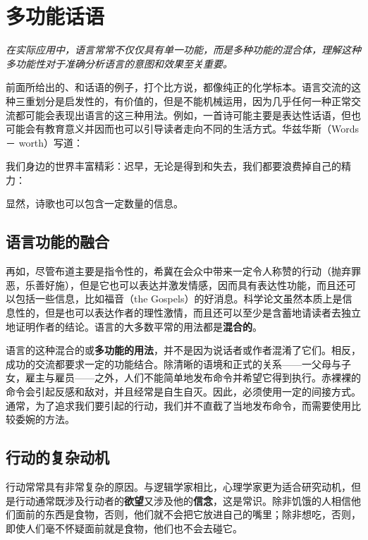 \section{多功能话语}

\begin{logicbox}[title=引言]
\textit{在实际应用中，语言常常不仅仅具有单一功能，而是多种功能的混合体，理解这种多功能性对于准确分析语言的意图和效果至关重要。}
\end{logicbox}

前面所给出的、和话语的例子，打个比方说，都像纯正的化学标本。语言交流的这种三重划分是启发性的，有价值的，但是不能机械运用，因为几乎任何一种正常交流都可能会表现出语言的这三种用法。例如，一首诗可能主要是表达性话语，但也可能会有教育意义并因而也可以引导读者走向不同的生活方式。华兹华斯（Words－ worth）写道：

我们身边的世界丰富精彩：迟早，无论是得到和失去，我们都要浪费掉自己的精力：

显然，诗歌也可以包含一定数量的信息。\\

\subsection{语言功能的融合}

再如，尽管布道主要是指令性的，希冀在会众中带来一定令人称赞的行动（抛弃罪恶，乐善好施），但是它也可以表达并激发情感，因而具有表达性功能，而且还可以包括一些信息，比如福音（the Gospels）的好消息。科学论文虽然本质上是信息性的，但是也可以表达作者的理性激情，而且还可以至少是含蓄地请读者去独立地证明作者的结论。语言的大多数平常的用法都是\textbf{混合的}。

语言的这种混合的或\textbf{多功能的用法}，并不是因为说话者或作者混淆了它们。相反，成功的交流都要求一定的功能结合。除清晰的语境和正式的关系——一父母与子女，雇主与雇员——之外，人们不能简单地发布命令并希望它得到执行。赤裸裸的命令会引起反感和敌对，并且经常是自生自灭。因此，必须使用一定的间接方式。通常，为了追求我们要引起的行动，我们并不直截了当地发布命令，而需要使用比较委婉的方法。

\subsection{行动的复杂动机}

行动常常具有非常复杂的原因。与逻辑学家相比，心理学家更为适合研究动机，但是行动通常既涉及行动者的\textbf{欲望}又涉及他的\textbf{信念}，这是常识。除非饥饿的人相信他们面前的东西是食物，否则，他们就不会把它放进自己的嘴里；除非想吃，否则，即使人们毫不怀疑面前就是食物，他们也不会去碰它。

